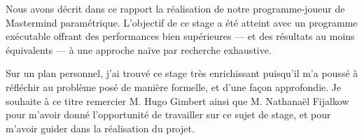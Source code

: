 \documentclass[a4paper]{article}
\renewcommand{\(}{\begin{math}\color{brick}}
\renewcommand{\)}{\end{math}}
\begin{document}
Nous avons décrit dans ce rapport la réalisation de notre programme-joueur de Mastermind paramétrique. L'objectif de ce stage a été atteint avec un programme exécutable offrant des performances bien supérieures --- et des résultats au moins équivalents --- à une approche naïve par recherche exhaustive.

Sur un plan personnel, j'ai trouvé ce stage très enrichissant puisqu'il m'a poussé à réfléchir au problème posé de manière formelle, et d'une façon approfondie. Je souhaite à ce titre remercier M. Hugo Gimbert ainsi que M. Nathanaël Fijalkow pour m'avoir donné l'opportunité de travailler sur ce sujet de stage, et pour m'avoir guider dans la réalisation du projet.

\printbibliography[heading=bibintoc]
\end{document}
